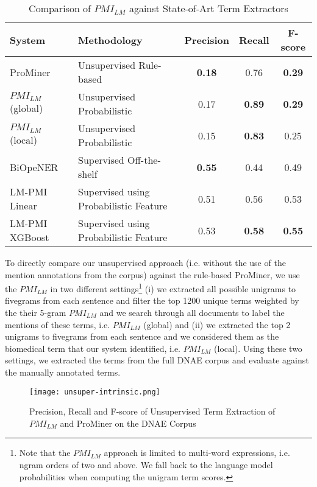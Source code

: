 \begin{table}[H]
\centering
    \begin{tabular}{llccc}
    \textbf{System}      & \textbf{Methodology}                 & \textbf{Precision} & \textbf{Recall} &\textbf{ F-score} \\ \hline
    ProMiner    & Unsupervised Rule-based                & \textbf{0.18}      & 0.76   & \textbf{0.29}    \\
    $PMI_{LM}$ (global)     & Unsupervised Probabilistic             & 0.17      &\textbf{ 0.89 }  & \textbf{0.29}    \\ 
    $PMI_{LM}$ (local)     & Unsupervised Probabilistic             & 0.15      &\textbf{ 0.83 }  & 0.25   \\ \hline
    BiOpeNER    & Supervised Off-the-shelf               & \textbf{0.55}      & 0.44   & 0.49    \\
    LM-PMI Linear  & Supervised using Probabilistic Feature & 0.51      & 0.56   & 0.53    \\
    LM-PMI XGBoost  & Supervised using Probabilistic Feature & 0.53      & \textbf{0.58}   & \textbf{0.55 }   \\
    \end{tabular}
\caption{Comparison of $PMI_{LM}$ against State-of-Art Term Extractors}
\label{table:pmllmbiomed}
\end{table}

To directly compare our unsupervised approach (i.e. without the use of the mention annotations from the corpus) against the rule-based ProMiner, we use the $PMI_{LM}$ in two different settings\footnote{Note that the $PMI_{LM}$ approach is limited to multi-word expressions, i.e. ngram orders of two and above. We fall back to the language model probabilities when computing the unigram term scores.} (i) we extracted all possible unigrams to fivegrams from each sentence and filter the top 1200 unique terms weighted by the their 5-gram $PMI_{LM}$ and we search through all documents to label the mentions of these terms, i.e. $PMI_{LM}$ (global) and (ii) we extracted the top 2 unigrams to fivegrams from each sentence and we considered them as the biomedical term that our system identified, i.e. $PMI_{LM}$ (local). Using these two settings, we extracted the terms from the full DNAE corpus and evaluate against the manually annotated terms.

\begin{figure}[!htb]
\centering
	\hspace{-2em}%
	\texttt{[image: unsuper-intrinsic.png]} \\[-1em]
	\caption{Precision, Recall and F-score of Unsupervised Term Extraction of $PMI_{LM}$ and ProMiner on the DNAE Corpus}
	\label{fig-unsuper-intrinsic}
\end{figure}

